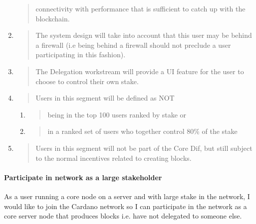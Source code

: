 \documentclass[11pt,a4paper]{article}
\begin{document}
\begin{enumerate}
\begin{quote}
  connectivity with performance that is sufficient to catch up with the
  blockchain.
  \end{quote}
\item
  \begin{quote}
  The system design will take into account that this user may be behind
  a firewall (i.e being behind a firewall should not preclude a user
  participating in this fashion).
  \end{quote}
\item
  \begin{quote}
  The Delegation workstream will provide a UI feature for the user to
  choose to control their own stake.
  \end{quote}
\item
  \begin{quote}
  Users in this segment will be defined as NOT
  \end{quote}

  \begin{enumerate}
  \def\labelenumii{\alph{enumii}.}
  \item
    \begin{quote}
    being in the top 100 users ranked by stake or
    \end{quote}
  \item
    \begin{quote}
    in a ranked set of users who together control 80\% of the stake
    \end{quote}
  \end{enumerate}
\item
  \begin{quote}
  Users in this segment will not be part of the Core Dif, but still
  subject to the normal incentives related to creating blocks.
  \end{quote}
\end{enumerate}

\paragraph{Participate in network as a large stakeholder}
\label{participate-in-network-as-a-large-stakeholder}

As a user running a core node on a server and with large stake in the
network, I would like to join the Cardano network so I can participate
in the network as a core server node that produces blocks i.e. have not
delegated to someone else.
\end{document}

